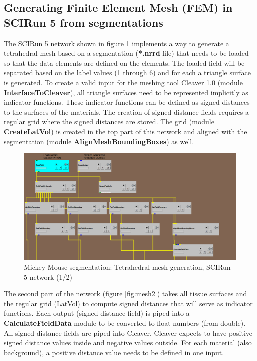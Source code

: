 \documentclass[fleqn,11pt,openany]{book}
\begin{document}
\newpage

\subsection{Generating Finite Element Mesh (FEM) in SCIRun 5 from segmentations}
The SCIRun 5 network shown in figure \ref{fig:mesh1} implements a way to generate a tetrahedral mesh based on a segmentation (\textbf{*.nrrd} file) that needs to be loaded so that the data elements
are defined on the elements. The loaded field will be separated based on the label values (1 through 6) and for each a triangle surface is generated.
To create a valid input for the meshing tool Cleaver 1.0 (module \textbf{InterfaceToCleaver}), all triangle surfaces need to be represented implicitly as indicator functions.
These indicator functions can be defined as signed distances to the surfaces of the materials. The creation of signed distance fields requires a regular grid where the signed distances are stored.
The grid (module \textbf{CreateLatVol}) is created in the top part of this network and aligned with the segmentation (module \textbf{AlignMeshBoundingBoxes}) as well.

\begin{figure}[!h]
\centering
\includegraphics[width=1.0\textwidth]{BrainStimulation_figures/make_mesh1.png}
\caption{ Mickey Mouse segmentation: Tetrahedral mesh generation, SCIRun 5 network (1/2) }
\label{fig:mesh1}
\end{figure}

The second part of the network (figure \ref{fig:mesh2}) takes all tissue surfaces and the regular grid (LatVol) to compute signed distances that will serve as indicator functions.
Each output (signed distance field) is piped into a \textbf{CalculateFieldData} module to be converted to float numbers (from double). All signed distance fields are piped into Cleaver. Cleaver expects to have positive signed distance values inside and negative values outside. For each material (also background), a positive distance value needs to be defined in one input.
\end{document}
